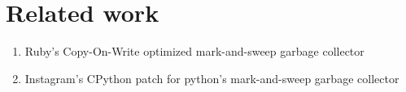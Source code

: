 \documentclass{article}
\begin{document}
\section{Related work}
\begin{enumerate}
  \item Ruby's Copy-On-Write optimized mark-and-sweep garbage collector
  \item Instagram's CPython patch for python's mark-and-sweep garbage collector
\end{enumerate}

\newpage
\onecolumn
\nocite{*}


\end{document}
